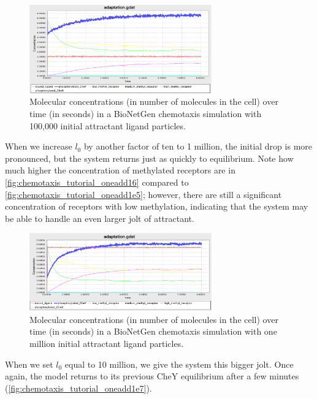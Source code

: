 \begin{figure}[h]
\centering
\mySfFamily
\includegraphics[width = 0.7\textwidth]{../images/chemotaxis_tutorial_oneadd1e5.png}
\caption{Molecular concentrations (in number of molecules in the cell) over time (in seconds) in a BioNetGen chemotaxis simulation with 100,000 initial attractant ligand particles.}
\label{fig:chemotaxis_tutorial_oneadd1e5}
\end{figure}


When we increase $l_0$ by another factor of ten to 1 million, the initial drop is more pronounced, but the system returns just as quickly to equilibrium. Note how much higher the concentration of methylated receptors are in \autoref{fig:chemotaxis_tutorial_oneadd16} compared to \autoref{fig:chemotaxis_tutorial_oneadd1e5}; however, there are still a significant concentration of receptors with low methylation, indicating that the system may be able to handle an even larger jolt of attractant.

\begin{figure}[h]
\centering
\mySfFamily
\includegraphics[width = 0.7\textwidth]{../images/chemotaxis_tutorial_oneadd1e6.png}
\caption{Molecular concentrations (in number of molecules in the cell) over time (in seconds) in a BioNetGen chemotaxis simulation with one million initial attractant ligand particles.}
\label{fig:chemotaxis_tutorial_oneadd16}
\end{figure}

When we set $l_0$ equal to 10 million, we give the system this bigger jolt. Once again, the model returns to its previous CheY equilibrium after a few minutes (\autoref{fig:chemotaxis_tutorial_oneadd1e7}).

